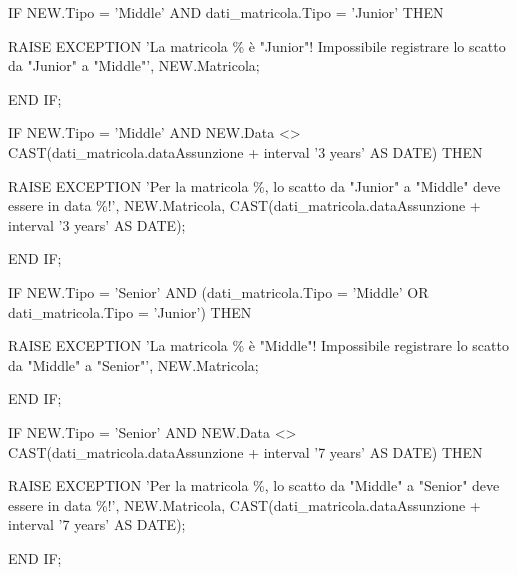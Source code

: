 \begin{flushleft}
\begin{description}
\begin{description}
                        \vspace{0.5cm}

                        \item IF NEW.Tipo = 'Middle' AND dati\_matricola.Tipo = 'Junior' THEN
                        \begin{description}
                            \item RAISE EXCEPTION 'La matricola \% è "Junior"! Impossibile registrare lo scatto da "Junior" a "Middle"', NEW.Matricola;
                        \end{description}
                        \item END IF;

                        \vspace{0.5cm}

                        \item IF NEW.Tipo = 'Middle' AND NEW.Data <> CAST(dati\_matricola.dataAssunzione + interval '3 years' AS DATE) THEN
                        \begin{description}
                            \item RAISE EXCEPTION 'Per la matricola \%, lo scatto da "Junior" a "Middle" deve essere in data \%!', NEW.Matricola, CAST(dati\_matricola.dataAssunzione + interval '3 years' AS DATE);
                        \end{description}
                        \item END IF;

                        \vspace{0.5cm}

                        \item IF NEW.Tipo = 'Senior' AND (dati\_matricola.Tipo = 'Middle' OR dati\_matricola.Tipo = 'Junior') THEN
                        \begin{description}
                            \item RAISE EXCEPTION 'La matricola \% è "Middle"! Impossibile registrare lo scatto da "Middle" a "Senior"', NEW.Matricola;
                        \end{description}
                        \item END IF;
                        
                        \vspace{0.5cm}

                        \item IF NEW.Tipo = 'Senior' AND NEW.Data <> CAST(dati\_matricola.dataAssunzione + interval '7 years' AS DATE) THEN
                        \begin{description}
                            \item RAISE EXCEPTION 'Per la matricola \%, lo scatto da "Middle" a "Senior" deve essere in data \%!', NEW.Matricola, CAST(dati\_matricola.dataAssunzione + interval '7 years' AS DATE);
                        \end{description}
                        \item END IF;


\end{description}
\end{description}
\end{flushleft}
